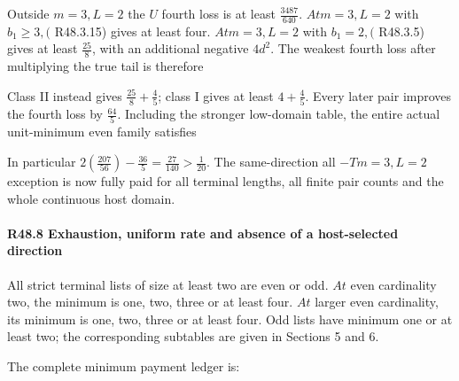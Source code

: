 Outside \(m=3,\allowbreak \allowbreak L=2\) the \(U\) fourth loss is at least \(\frac{3487}{640}\). \(At m=3,\allowbreak \allowbreak L=2\) with \(b_{1}\ge 3,\allowbreak \allowbreak  (\) R48.3.15) gives at least four. \(At m=3,\allowbreak \allowbreak L=2\) with \(b_{1}=2,\allowbreak \allowbreak  (\) R48.3.5) gives at least \(\frac{25}{8}\), with an additional negative \(4d^2\). The weakest fourth loss after multiplying the true tail is therefore


Class II instead gives \(\frac{25}{8}+\frac{4}{5}\); class I gives at least \(4+\frac{4}{5}\). Every later pair improves the fourth loss by \(\frac{64}{5}\). Including the stronger low-domain table, the entire actual unit-minimum even family satisfies


In particular \(2(\frac{207}{56})-\frac{36}{5}=\frac{27}{140}>\frac{1}{20}\). The same-direction all \(-T m=3,\allowbreak \allowbreak L=2\) exception is now fully paid for all terminal lengths, all finite pair counts and the whole continuous host domain.

\paragraph{R48.8 Exhaustion, uniform rate and absence of a host-selected direction}

All strict terminal lists of size at least two are even or odd. \(At\) even cardinality two, the minimum is one, two, three or at least four. \(At\) larger even cardinality, its minimum is one, two, three or at least four. Odd lists have minimum one or at least two; the corresponding subtables are given in Sections 5 and 6.

The complete minimum payment ledger is:

